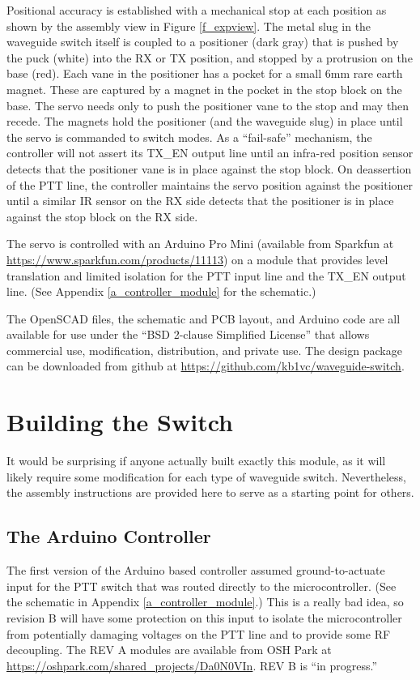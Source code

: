 \documentclass[12pt]{article}
\begin{document}
Positional accuracy is established with a mechanical stop at each
position as shown by the assembly view in Figure \ref{f_expview}. The
metal slug in the waveguide switch itself is coupled to a positioner
(dark gray) that is pushed by the puck (white) into the RX or TX
position, and stopped by a protrusion on the base (red). Each vane in
the positioner has a pocket for a small 6mm rare earth magnet. These
are captured by a magnet in the pocket in the stop block on the
base. The servo needs only to push the positioner vane to the stop and
may then recede. The magnets hold the positioner (and the waveguide
slug) in place until the servo is commanded to switch modes.  As a
``fail-safe'' mechanism, the controller will not assert its TX\_EN
output line until an infra-red position sensor detects that the
positioner vane is in place against the stop block.  On deassertion of
the PTT line, the controller maintains the servo position against the
positioner until a similar IR sensor on the RX side detects that the
positioner is in place against the stop block on the RX side.

The servo is controlled with an Arduino Pro Mini (available from
Sparkfun at \url{https://www.sparkfun.com/products/11113}) on a module
that provides level translation and limited isolation for the PTT
input line and the TX\_EN output line. (See Appendix \ref{a_controller_module}
for the schematic.)

The OpenSCAD files, the schematic and PCB layout, and Arduino code are
all available for use under the ``BSD 2-clause Simplified License'' that
allows commercial use, modification, distribution, and private use.
The design package can be downloaded from github at \url{https://github.com/kb1vc/waveguide-switch}.

\section{Building the Switch}

It would be surprising if anyone actually built exactly this module,
as it will likely require some modification for each type of waveguide
switch.  Nevertheless, the assembly instructions are provided here to
serve as a starting point for others.

\subsection{The Arduino Controller}

The first version of the Arduino based controller assumed ground-to-actuate
input for the PTT switch that was routed directly to the microcontroller.
(See the schematic in Appendix \ref{a_controller_module}.)
This is a really bad idea, so revision B will have some protection on this
input to isolate the microcontroller from potentially damaging voltages on the
PTT line and to provide some RF decoupling.
The REV A modules are available from OSH Park at \url{https://oshpark.com/shared_projects/Da0N0VIn}.
REV B is ``in progress.''
\end{document}
